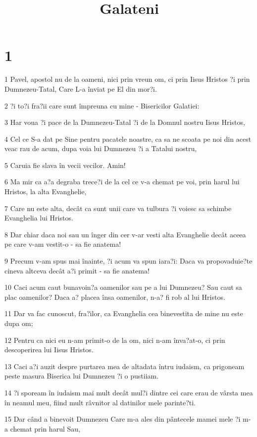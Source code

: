 

\title{Galateni}


\chapter{1}

\par 1 Pavel, apostol nu de la oameni, nici prin vreun om, ci prin Iisus Hristos ?i prin Dumnezeu-Tatal, Care L-a înviat pe El din mor?i.
\par 2 ?i to?i fra?ii care sunt împreuna cu mine - Bisericilor Galatiei:
\par 3 Har voua ?i pace de la Dumnezeu-Tatal ?i de la Domnul nostru Iisus Hristos,
\par 4 Cel ce S-a dat pe Sine pentru pacatele noastre, ca sa ne scoata pe noi din acest veac rau de acum, dupa voia lui Dumnezeu ?i a Tatalui nostru,
\par 5 Caruia fie slava în vecii vecilor. Amin!
\par 6 Ma mir ca a?a degraba trece?i de la cel ce v-a chemat pe voi, prin harul lui Hristos, la alta Evanghelie,
\par 7 Care nu este alta, decât ca sunt unii care va tulbura ?i voiesc sa schimbe Evanghelia lui Hristos.
\par 8 Dar chiar daca noi sau un înger din cer v-ar vesti alta Evanghelie decât aceea pe care v-am vestit-o - sa fie anatema!
\par 9 Precum v-am spus mai înainte, ?i acum va spun iara?i: Daca va propovaduie?te cineva altceva decât a?i primit - sa fie anatema!
\par 10 Caci acum caut bunavoin?a oamenilor sau pe a lui Dumnezeu? Sau caut sa plac oamenilor? Daca a? placea însa oamenilor, n-a? fi rob al lui Hristos.
\par 11 Dar va fac cunoscut, fra?ilor, ca Evanghelia cea binevestita de mine nu este dupa om;
\par 12 Pentru ca nici eu n-am primit-o de la om, nici n-am înva?at-o, ci prin descoperirea lui Iisus Hristos.
\par 13 Caci a?i auzit despre purtarea mea de altadata întru iudaism, ca prigoneam peste masura Biserica lui Dumnezeu ?i o pustiiam.
\par 14 ?i spoream în iudaism mai mult decât mul?i dintre cei care erau de vârsta mea în neamul meu, fiind mult râvnitor al datinilor mele parinte?ti.
\par 15 Dar când a binevoit Dumnezeu Care m-a ales din pântecele mamei mele ?i m-a chemat prin harul Sau,
